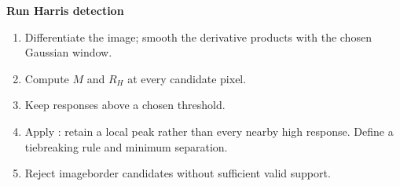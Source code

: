 \documentclass[letterpaper,11pt,english,openany,oneside]{jupyterBook}
\begin{document}
\begin{TextbookBox}
\textbf{Run Harris detection}\par\smallskip
\begin{enumerate}
%
\item {}
\sphinxAtStartPar
Differentiate the image; smooth the derivative products with the chosen Gaussian window.

\item {}
\sphinxAtStartPar
Compute \(M\) and \(R_H\) at every candidate pixel.

\item {}
\sphinxAtStartPar
Keep responses above a chosen threshold.

\item {}
\sphinxAtStartPar
Apply : retain a local peak rather than every nearby high response. Define a tie\sphinxhyphen{}breaking rule and minimum separation.

\item {}
\sphinxAtStartPar
Reject image\sphinxhyphen{}border candidates without sufficient valid support.

\end{enumerate}

\end{TextbookBox}
\end{document}
